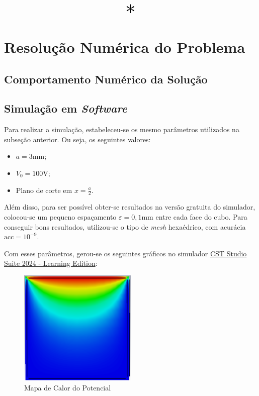 \documentclass{report}
\let\oldsection\section
\renewcommand\section{\clearpage\oldsection}
\begin{document}
\begin{center}
  \[ \scalebox{3}{$ * $} \]
\end{center}

\section{Resolução Numérica do Problema}
\label{sec:numerical}
\subsection{Comportamento Numérico da Solução}
\subsection{Simulação em \textit{Software}}

Para realizar a simulação, estabeleceu-se os mesmo parâmetros utilizados na subseção anterior. Ou seja, os seguintes valores:

\begin{itemize}
  \item $ a = 3 \text{mm}$;
  \item $ V_0 = 100 \text{V}$;
  \item Plano de corte em $ x = \frac{a}{2} $.
\end{itemize}

Além disso, para ser possível obter-se resultados na versão gratuita do simulador, colocou-se um pequeno espaçamento $ \varepsilon = 0,1\text{mm} $ entre cada face do cubo.
Para conseguir bons resultados, utilizou-se o tipo de \textit{mesh} hexaédrico, com acurácia $ \text{acc} = 10^{-9} $.

Com esses parâmetros, gerou-se os seguintes gráficos no simulador \href{https://www.3ds.com/edu/education/students/solutions/cst-le}{CST Studio Suite 2024 - Learning Edition}:

\begin{figure}[h!]
  \centering
  \includegraphics[width=0.5\textwidth]{images/plots/simulation_heatmap.png}
  \caption{\label{plot:simul_potential_heatmap} Mapa de Calor do Potencial}
\end{figure}
\end{document}
